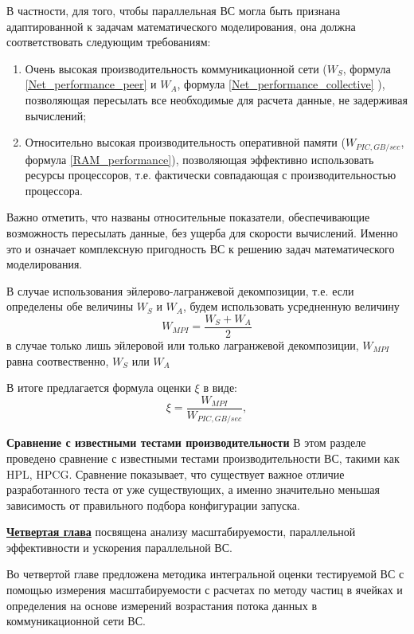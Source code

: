 В частности, для того, чтобы параллельная ВС могла быть признана адаптированной к задачам математического моделирования, она должна соответствовать следующим требованиям:
\begin{enumerate}
	\item Очень высокая производительность коммуникационной сети ($W_S$, формула \ref{Net_performance_peer} и $W_A$, формула \ref{Net_performance_collective} ), позволяющая пересылать все необходимые для расчета данные, не задерживая вычислений;
	
	\item Относительно высокая производительность оперативной памяти ($W_{PIC,GB/sec}$, формула \ref{RAM_performance}), позволяющая эффективно использовать ресурсы процессоров, т.е. фактически совпадающая с производительностью процессора.  	
\end{enumerate}

Важно отметить, что названы относительные показатели, обеспечивающие возможность пересылать данные, без ущерба для скорости вычислений. Именно это и означает  комплексную пригодность ВС к решению задач математического моделирования.

В случае использования эйлерово-лагранжевой декомпозиции, т.е. если определены обе величины $W_S$ и $W_A$, будем использовать усредненную величину
\begin{equation}
W_{MPI} = \frac{W_S + W_A}{2}
\end{equation}
в случае только лишь эйлеровой или только лагранжевой декомпозиции, $W_{MPI}$ равна соотвественно, $W_S$ или $W_A$

В итоге предлагается формула оценки $\xi$ в виде:
\begin{equation}
\xi = \frac{W_{MPI}} { W_{PIC,GB/sec}}, 
\label{complex_rating}
\end{equation}

\textbf{Сравнение с известными тестами производительности}
В этом разделе проведено сравнение с известными тестами производительности ВС, такими как HPL, HPCG. Сравнение показывает, что существует важное отличие разработанного теста от уже существующих, а именно значительно меньшая зависимость от правильного подбора конфигурации запуска. 


\underline{\textbf{Четвертая глава}} посвящена  
анализу масштабируемости, параллельной эффективности и ускорения параллельной ВС.

Во четвертой главе предложена методика интегральной оценки тестируемой ВС с помощью измерения масштабируемости с расчетах по методу частиц в ячейках и определения на основе измерений возрастания потока данных в коммуникационной сети ВС.

